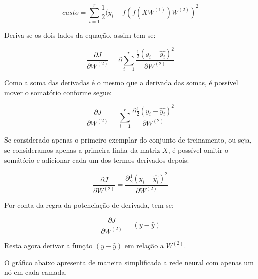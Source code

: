 \begin{equation}
custo = \sum_{i=1}^{r} \frac{1}{2}(y_i - f(f(XW^{(1)})W^{(2)})^2    
\end{equation}

Deriva-se os dois lados da equação, assim tem-se:

\begin{equation}
    \frac{\partial J}{\partial W^{(2)}} = \partial \sum_{i=1}^{r} \frac{ \frac{1}{2}(y_i - \hat{y_i})^2}{\partial W^{(2)}}
\end{equation}

Como a soma das derivadas é o mesmo que a derivada das somas, é possível mover o somatório conforme segue:

\begin{equation}
    \frac{\partial J}{\partial W^{(2)}} = \sum_{i=1}^{r} \frac{\partial \frac{1}{2}(y_i - \hat{y_i})^2}{\partial W^{(2)}}
\end{equation}

Se considerado apenas o primeiro exemplar do conjunto de treinamento, ou seja, se consideramos apenas a primeira linha da matriz $X$, é possível omitir o somátório e adicionar cada um dos termos derivados depois:

\begin{equation}
    \frac{\partial J}{\partial W^{(2)}} = \frac{\partial \frac{1}{2}(y_i - \hat{y_i})^2}{\partial W^{(2)}}
\end{equation}

Por conta da regra da potenciação de derivada, tem-se:

\begin{equation}
    \frac{\partial J}{\partial W^{(2)}} = (y - \hat{y})
\end{equation}

Resta agora derivar a função $(y-\hat{y})$ em relação a $W^{(2)}$. 

O gráfico abaixo apresenta de maneira simplificada a rede neural com apenas um nó em cada camada.



